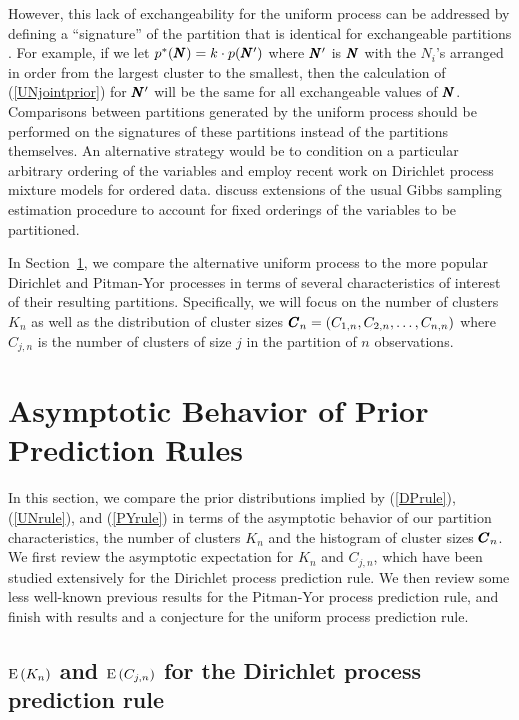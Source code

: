\documentclass[]{article}
\begin{document}
However, this lack of exchangeability for the uniform process can be
addressed by defining a ``signature'' of the partition that is
identical for exchangeable partitions \cite{GreRic01}.  For example,
if we let $p^{\ast}(\pmb{N}) = k \cdot p(\pmb{N}^{\prime})$ where
$\pmb{N}^{\prime}$ is $\pmb{N}$ with the $N_i$'s arranged in order from the
largest cluster to the smallest, then the calculation of
(\ref{UNjointprior}) for $\pmb{N}^{\prime}$ will be the same for all
exchangeable values of $\pmb{N}$.  Comparisons between partitions
generated by the uniform process should be performed on the signatures
of these partitions instead of the partitions themselves. An
alternative strategy would be to condition on a particular arbitrary
ordering of the variables and employ recent work \cite{ZhuGhaLaf05} on
Dirichlet process mixture models for ordered data.  \cite{ZhuGhaLaf05}
discuss extensions of the usual Gibbs sampling estimation procedure to
account for fixed orderings of the variables to be partitioned.

In Section~\ref{asymptotics}, we compare the alternative uniform
process to the more popular Dirichlet and Pitman-Yor processes in
terms of several characteristics of interest of their resulting
partitions.  Specifically, we will focus on the number of clusters
$K_n$ as well as the distribution of cluster sizes $\pmb{C}_n = (C_{1,n},
C_{2,n}, \ldots, C_{n,n})$ where $C_{j,n}$ is the number of clusters
of size $j$ in the partition of $n$ observations.

\section{Asymptotic Behavior of Prior Prediction
  Rules}\label{asymptotics}

In this section, we compare the prior distributions implied by
(\ref{DPrule}), (\ref{UNrule}), and (\ref{PYrule}) in terms of the
asymptotic behavior of our partition characteristics, the number of
clusters $K_n$ and the histogram of cluster sizes $\pmb{C}_n$.  We first
review the asymptotic expectation for $K_n$ and $C_{j,n}$, which have
been studied extensively for the Dirichlet process prediction rule.
We then review some less well-known previous results for the
Pitman-Yor process prediction rule, and finish with results and a
conjecture for the uniform process prediction rule.

\subsection{${\rm E}\,(K_n)$ and ${\rm E}\,(C_{j,n})$ for the Dirichlet
  process prediction rule} \label{DP_asymptotic}
\end{document}
